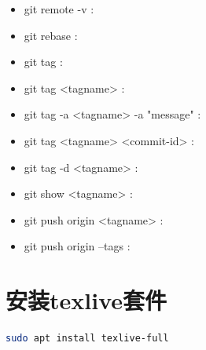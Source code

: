 \documentclass[12pt,twoside]{report}
\begin{document}
\begin{leftbar}
\begin{itemize}
        \item git remote -v :
        \item git rebase :
        \item git tag :
        \item git tag <tagname> :
        \item git tag -a <tagname> -a "message" :
        \item git tag <tagname> <commit-id> :
        \item git tag -d <tagname> :
        \item git show <tagname> :
        \item git push origin <tagname> :
        \item git push origin --tags :
    \end{itemize}
\end{leftbar}


\section{安装texlive套件}
\begin{lstlisting}[language=sh]
    sudo apt install texlive-full
\end{lstlisting}
\end{document}
